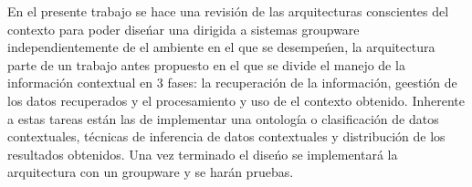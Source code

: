 En el presente trabajo se hace una revisi\'on de las arquitecturas conscientes del contexto para poder dise\'nar una dirigida a sistemas groupware independientemente de el ambiente en el que se desempe\'nen, la arquitectura parte de un trabajo antes propuesto en el que se divide el manejo de la informaci\'on contextual en 3 fases: la recuperaci\'on de la informaci\'on, geesti\'on de los datos recuperados y el procesamiento y uso de el contexto obtenido. Inherente a estas tareas est\'an las de implementar una ontolog\'ia o clasificaci\'on de datos contextuales, t\'ecnicas de inferencia de datos contextuales y distribuci\'on de los resultados obtenidos. Una vez terminado el dise\'no se implementar\'a la arquitectura con un groupware y se har\'an pruebas.